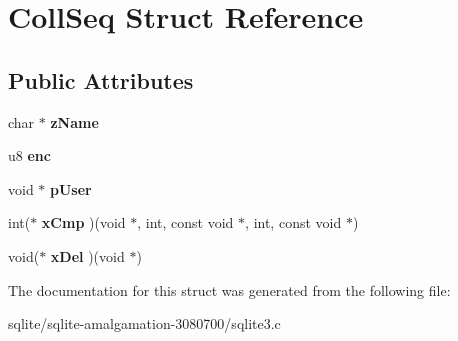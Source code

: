 \hypertarget{struct_coll_seq}{\section{Coll\+Seq Struct Reference}
\label{struct_coll_seq}
}
\subsection*{Public Attributes}
\begin{DoxyCompactItemize}
\item 
\hypertarget{struct_coll_seq_a48d6d5f71d4f8a3ab122903464e8b4a1}{char $\ast$ {\bfseries z\+Name}}\label{struct_coll_seq_a48d6d5f71d4f8a3ab122903464e8b4a1}

\item 
\hypertarget{struct_coll_seq_add27da1a70ed6f538447e9183eeb4838}{u8 {\bfseries enc}}\label{struct_coll_seq_add27da1a70ed6f538447e9183eeb4838}

\item 
\hypertarget{struct_coll_seq_a3cee924d41e730ccec7f686eb5b6f041}{void $\ast$ {\bfseries p\+User}}\label{struct_coll_seq_a3cee924d41e730ccec7f686eb5b6f041}

\item 
\hypertarget{struct_coll_seq_a47fc6d3a01eee354332ca515a8b493ce}{int($\ast$ {\bfseries x\+Cmp} )(void $\ast$, int, const void $\ast$, int, const void $\ast$)}\label{struct_coll_seq_a47fc6d3a01eee354332ca515a8b493ce}

\item 
\hypertarget{struct_coll_seq_a1c0dd3ad98c7bb2ef517f9170134a125}{void($\ast$ {\bfseries x\+Del} )(void $\ast$)}\label{struct_coll_seq_a1c0dd3ad98c7bb2ef517f9170134a125}

\end{DoxyCompactItemize}


The documentation for this struct was generated from the following file\+:\begin{DoxyCompactItemize}
\item 
sqlite/sqlite-\/amalgamation-\/3080700/sqlite3.\+c\end{DoxyCompactItemize}

